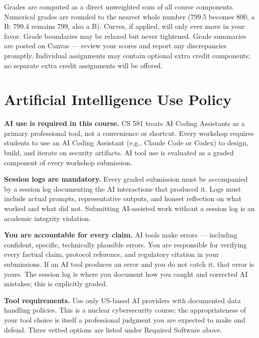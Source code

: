 \documentclass[9pt]{extarticle}
\begin{document}
\medskip

Grades are computed as a direct unweighted sum of all course components.
Numerical grades are rounded to the nearest whole number (799.5 becomes 800,
a B; 799.4 remains 799, also a B). Curves, if applied, will only ever move
in your favor. Grade boundaries may be relaxed but never tightened.
Grade summaries are posted on Canvas --- review your scores and report
any discrepancies promptly. Individual assignments may contain optional
extra credit components; no separate extra credit assignments will be offered.

\section*{Artificial Intelligence Use Policy}

\textbf{AI use is required in this course.} CS 581 treats AI Coding Assistants as a
primary professional tool, not a convenience or shortcut. Every workshop requires
students to use an AI Coding Assistant (e.g., Claude Code or Codex)
to design, build, and iterate on security artifacts. AI tool use is evaluated as
a graded component of every workshop submission.

\medskip

\textbf{Session logs are mandatory.} Every graded submission must be accompanied
by a session log documenting the AI interactions that produced it. Logs must include
actual prompts, representative outputs, and honest reflection on what worked and
what did not. Submitting AI-assisted work without a session log is an academic
integrity violation.

\medskip

\textbf{You are accountable for every claim.} AI tools make errors --- including
confident, specific, technically plausible errors. You are responsible for
verifying every factual claim, protocol reference, and regulatory citation in your
submissions. If an AI tool produces an error and you do not catch it, that error
is yours. The session log is where you document how you caught and corrected
AI mistakes; this is explicitly graded.

\medskip

\textbf{Tool requirements.} Use only US-based AI providers with documented data
handling policies. This is a nuclear cybersecurity course; the appropriateness of
your tool choice is itself a professional judgment you are expected to make and
defend. Three vetted options are listed under Required Software above.
\end{document}

